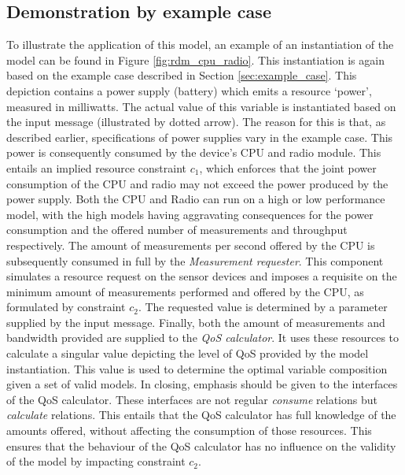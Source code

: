 \subsection{Demonstration by example case}
To illustrate the application of this model, an example of an instantiation of the model can be found in Figure \ref{fig:rdm_cpu_radio}. This instantiation is again based on the example case described in Section \ref{sec:example_case}. This depiction contains a power supply (battery) which emits a resource `power', measured in milliwatts. The actual value of this variable is instantiated based on the input message (illustrated by dotted arrow). The reason for this is that, as described earlier, specifications of power supplies vary in the example case. This power is consequently consumed by the device's CPU and radio module. This entails an implied resource constraint $c_1$, which enforces that the joint power consumption of the CPU and radio may not exceed the power produced by the power supply. Both the CPU and Radio can run on a high or low performance model, with the high models having aggravating consequences for the power consumption and the offered number of measurements and throughput respectively. The amount of measurements per second offered by the CPU is subsequently consumed in full by the \emph{Measurement requester}. This component simulates a resource request on the sensor devices and imposes a requisite on the minimum amount of measurements performed and offered by the CPU, as formulated by constraint $c_2$. The requested value is determined by a parameter supplied by the input message. Finally, both the amount of measurements and bandwidth provided are supplied to the \emph{QoS calculator}. It uses these resources to calculate a singular value depicting the level of QoS provided by the model instantiation. This value is used to determine the optimal variable composition given a set of valid models. In closing, emphasis should be given to the interfaces of the QoS calculator. These interfaces are not regular \emph{consume} relations but \emph{calculate} relations. This entails that the QoS calculator has full knowledge of the amounts offered, without affecting the consumption of those resources. This ensures that the behaviour of the QoS calculator has no influence on the validity of the model by impacting constraint $c_2$.

